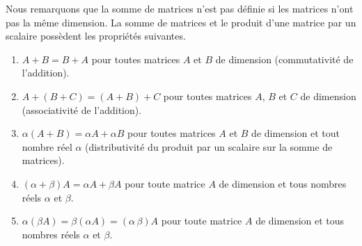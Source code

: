 {Nous remarquons que la somme de matrices n'est pas définie si les matrices
n'ont pas la même dimension.  La somme de matrices et le produit
d'une matrice par un scalaire possèdent les propriétés suivantes.

\begin{prop}
\begin{enumerate}
\item $A+B = B+A$ pour toutes matrices $A$ et $B$ de dimension
 (commutativité de l'addition).
\item $A+(B+C) = (A+B)+C$ pour toutes matrices $A$, $B$ et $C$ de
dimension  (associativité de l'addition). 
\item $\alpha(A+B) = \alpha A + \alpha B$ pour toutes matrices $A$ et
$B$ de dimension  et tout nombre réel $\alpha$
(distributivité du produit par un scalaire sur la somme de matrices).
\item $(\alpha+\beta) A = \alpha A + \beta A$ pour toute matrice $A$
de dimension  et tous nombres réels $\alpha$ et $\beta$.
\item $\alpha (\beta A) = \beta (\alpha A) = (\alpha\,\beta) A$ pour
toute matrice $A$ de dimension  et tous nombres réels
$\alpha$ et $\beta$.
\end{enumerate}
\end{prop}

}
